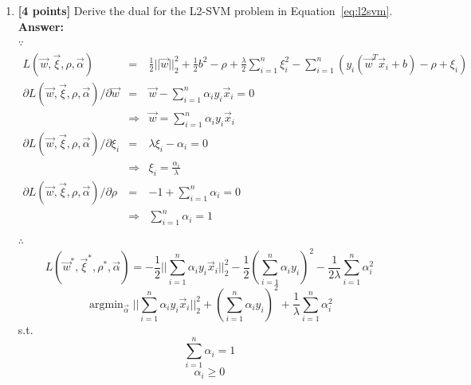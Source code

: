 \documentclass{article}
\DeclareMathOperator*{\argmin}{\mathrm{argmin}}
\begin{document}
\begin{enumerate}[resume]
    \item \textbf{[4 points]} Derive the dual for the L2-SVM problem in Equation~\ref{eq:l2svm}.\\
    \textbf{Answer:}\\
    $\because$
    \begin{equation}
    \nonumber
    \begin{array}{rcl}
    L(\vec{w},\vec{\xi},\rho,\vec{\alpha}) & = & \frac{1}{2}||\vec{w}||_2^2 + \frac{1}{2}b^2 - \rho + \frac{\lambda}{2}\sum_{i=1}^{n}\xi_i^2-\sum_{i=1}^{n}(y_i(\vec{w}^T\vec{x}_i+b)-\rho+\xi_i) \\
    \partial L(\vec{w},\vec{\xi},\rho,\vec{\alpha}) / \partial \vec{w} & = & \vec{w} - \sum_{i=1}^{n}\alpha_iy_i\vec{x}_i = 0 \\
    			& \Rightarrow & \vec{w} = \sum_{i=1}^{n}\alpha_iy_i\vec{x}_i \\
    \partial L(\vec{w},\vec{\xi},\rho,\vec{\alpha}) / \partial \xi_i & = & \lambda\xi_i - \alpha_i = 0 \\
    			& \Rightarrow & \xi_i=\frac{\alpha_i}{\lambda} \\
    \partial L(\vec{w},\vec{\xi},\rho,\vec{\alpha}) / \partial \rho & = &  -1 + \sum_{i=1}^{n}\alpha_i = 0 \\
    			& \Rightarrow & \sum_{i=1}^{n}\alpha_i = 1 \\
    \end{array}
    \end{equation}
    $\therefore$
    $$L(\vec{w}^*,\vec{\xi}^*,\rho^*,\vec{\alpha}) = -\frac{1}{2}||\sum_{i=1}^{n}\alpha_iy_i\vec{x}_i||_2^2 - \frac{1}{2}(\sum_{i=1}^{n}\alpha_iy_i)^2 - \frac{1}{2\lambda}\sum_{i=1}^{n}\alpha_i^2 $$
    $$\argmin_{\vec{\alpha}}||\sum_{i=1}^{n}\alpha_iy_i\vec{x}_i||_2^2 + (\sum_{i=1}^{n}\alpha_iy_i)^2 + \frac{1}{\lambda}\sum_{i=1}^{n}\alpha_i^2 $$
    s.t.
    $$\sum_{i=1}^{n}\alpha_i=1$$
    $$\alpha_i \geq 0$$
    

\end{enumerate}
\end{document}
